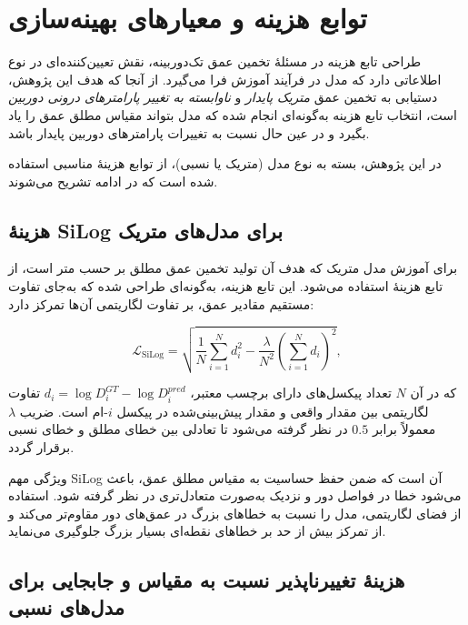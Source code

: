 \section{توابع هزینه و معیارهای بهینه‌سازی}
\label{sec:loss_functions}

طراحی تابع هزینه در مسئلهٔ تخمین عمق تک‌دوربینه، نقش تعیین‌کننده‌ای در نوع اطلاعاتی دارد که مدل در فرآیند آموزش فرا می‌گیرد. از آنجا که هدف این پژوهش، دستیابی به تخمین عمق \emph{متریک پایدار} و \emph{ناوابسته به تغییر پارامترهای درونی دوربین} است، انتخاب تابع هزینه به‌گونه‌ای انجام شده که مدل بتواند مقیاس مطلق عمق را یاد بگیرد و در عین حال نسبت به تغییرات پارامترهای دوربین پایدار باشد.

در این پژوهش، بسته به نوع مدل (متریک یا نسبی)، از توابع هزینهٔ مناسبی استفاده شده است که در ادامه تشریح می‌شوند.

\subsection{هزینهٔ SiLog برای مدل‌های متریک}

برای آموزش مدل متریک که هدف آن تولید تخمین عمق مطلق بر حسب متر است، از تابع هزینهٔ  استفاده می‌شود. این تابع هزینه، به‌گونه‌ای طراحی شده که به‌جای تفاوت مستقیم مقادیر عمق، بر تفاوت لگاریتمی آن‌ها تمرکز دارد:

\begin{equation}
\mathcal{L}_{\text{SiLog}} = \sqrt{\frac{1}{N} \sum_{i=1}^{N} d_i^2 - \frac{\lambda}{N^2} \left( \sum_{i=1}^{N} d_i \right)^2},
\end{equation}

که در آن $N$ تعداد پیکسل‌های دارای برچسب معتبر، $d_i = \log D_i^{GT} - \log D_i^{pred}$ تفاوت لگاریتمی بین مقدار واقعی و مقدار پیش‌بینی‌شده در پیکسل $i$-ام است. ضریب $\lambda$ معمولاً برابر $0.5$ در نظر گرفته می‌شود تا تعادلی بین خطای مطلق و خطای نسبی برقرار گردد.

ویژگی مهم SiLog آن است که ضمن حفظ حساسیت به مقیاس مطلق عمق، باعث می‌شود خطا در فواصل دور و نزدیک به‌صورت متعادل‌تری در نظر گرفته شود. استفاده از فضای لگاریتمی، مدل را نسبت به خطاهای بزرگ در عمق‌های دور مقاوم‌تر می‌کند و از تمرکز بیش از حد بر خطاهای نقطه‌ای بسیار بزرگ جلوگیری می‌نماید.

\subsection{هزینهٔ تغییرناپذیر نسبت به مقیاس و جابجایی برای مدل‌های نسبی}

